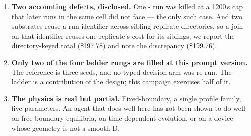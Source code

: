\begin{enumerate}
\item \textbf{Two accounting defects, disclosed.} One \Lthree{}- run
  was killed at a 1200\,s cap that later runs in the same cell did not face ---
  the only such case. And two substrates reuse a run identifier across sibling
  replicate directories, so a join on that identifier reuses one replicate's
  cost for its siblings; we report the directory-keyed total (\$197.78) and
  note the discrepancy (\$199.76).

\item \textbf{Only two of the four ladder rungs are filled at this prompt
  version.} The \Lzero{} reference is three seeds, and no \Lone{}
  typed-decision arm was re-run. The ladder is a contribution of the design;
  this campaign exercises half of it.

\item \textbf{The physics is real but partial.} Fixed-boundary, a single
  profile family, five parameters. An agent that does well here has not been
  shown to do well on free-boundary equilibria, on time-dependent evolution, or
  on a device whose geometry is not a smooth D.
\end{enumerate}
